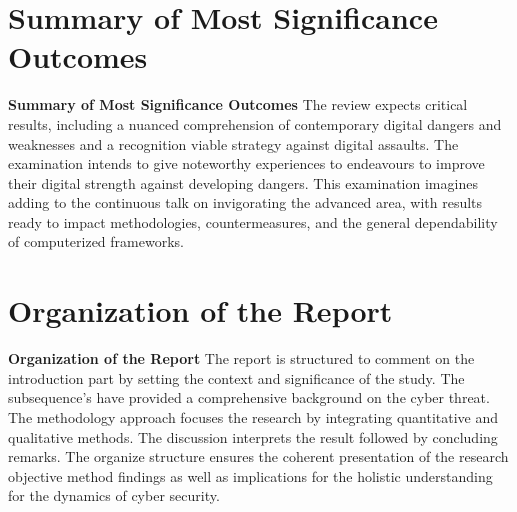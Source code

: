 \section{Summary of Most Significance Outcomes}
\label{sec:into_back}
\textbf{Summary of Most Significance Outcomes}
The review expects critical results, including a nuanced comprehension of contemporary digital dangers and weaknesses and a recognition viable strategy against digital assaults. The examination intends to give noteworthy experiences to endeavours to improve their digital strength against developing dangers.  This examination imagines adding to the continuous talk on invigorating the advanced area, with results ready to impact methodologies, countermeasures, and the general dependability of computerized frameworks.


\section{Organization of the Report}
\label{sec:into_back}
\textbf{Organization of the Report}
The report is structured to comment on the introduction part by setting the context and significance of the study. The subsequence’s have provided a comprehensive background on the cyber threat. The methodology approach focuses the research by integrating quantitative and qualitative methods. The discussion interprets the result followed by concluding remarks. The organize structure ensures the coherent presentation of the research objective method findings as well as implications for the holistic understanding for the dynamics of cyber security.



